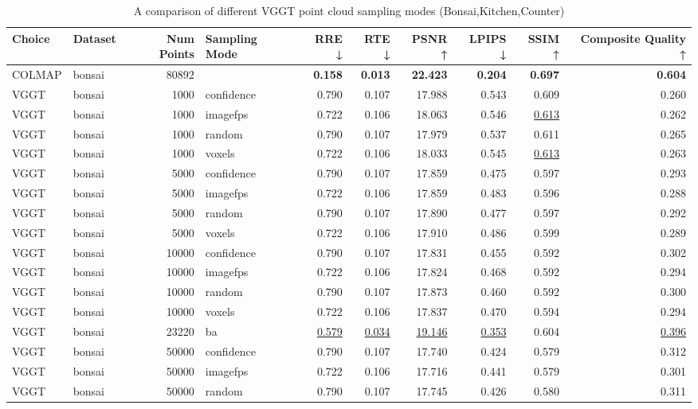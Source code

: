 \begin{table}[H]
\caption{A comparison of different VGGT point cloud sampling modes (Bonsai,Kitchen,Counter)}
\label{tab:03_sampling_mode_bonsai,kitchen,counter}
\small
\begin{tabular}{llrlrrrrrr}
\toprule
Choice & Dataset & Num Points & Sampling Mode & RRE ↓ & RTE ↓ & PSNR ↑ & LPIPS ↓ & SSIM ↑ & Composite Quality ↑ \\
\midrule
COLMAP & bonsai & 80892 &  & \textbf{0.158} & \textbf{0.013} & \textbf{22.423} & \textbf{0.204} & \textbf{0.697} & \textbf{0.604} \\
VGGT & bonsai & 1000 & confidence & 0.790 & 0.107 & 17.988 & 0.543 & 0.609 & 0.260 \\
VGGT & bonsai & 1000 & imagefps & 0.722 & 0.106 & 18.063 & 0.546 & \underline{0.613} & 0.262 \\
VGGT & bonsai & 1000 & random & 0.790 & 0.107 & 17.979 & 0.537 & 0.611 & 0.265 \\
VGGT & bonsai & 1000 & voxels & 0.722 & 0.106 & 18.033 & 0.545 & \underline{0.613} & 0.263 \\
VGGT & bonsai & 5000 & confidence & 0.790 & 0.107 & 17.859 & 0.475 & 0.597 & 0.293 \\
VGGT & bonsai & 5000 & imagefps & 0.722 & 0.106 & 17.859 & 0.483 & 0.596 & 0.288 \\
VGGT & bonsai & 5000 & random & 0.790 & 0.107 & 17.890 & 0.477 & 0.597 & 0.292 \\
VGGT & bonsai & 5000 & voxels & 0.722 & 0.106 & 17.910 & 0.486 & 0.599 & 0.289 \\
VGGT & bonsai & 10000 & confidence & 0.790 & 0.107 & 17.831 & 0.455 & 0.592 & 0.302 \\
VGGT & bonsai & 10000 & imagefps & 0.722 & 0.106 & 17.824 & 0.468 & 0.592 & 0.294 \\
VGGT & bonsai & 10000 & random & 0.790 & 0.107 & 17.873 & 0.460 & 0.592 & 0.300 \\
VGGT & bonsai & 10000 & voxels & 0.722 & 0.106 & 17.837 & 0.470 & 0.594 & 0.294 \\
VGGT & bonsai & 23220 & ba & \underline{0.579} & \underline{0.034} & \underline{19.146} & \underline{0.353} & 0.604 & \underline{0.396} \\
VGGT & bonsai & 50000 & confidence & 0.790 & 0.107 & 17.740 & 0.424 & 0.579 & 0.312 \\
VGGT & bonsai & 50000 & imagefps & 0.722 & 0.106 & 17.716 & 0.441 & 0.579 & 0.301 \\
VGGT & bonsai & 50000 & random & 0.790 & 0.107 & 17.745 & 0.426 & 0.580 & 0.311 \\

\end{tabular}
\end{table}
